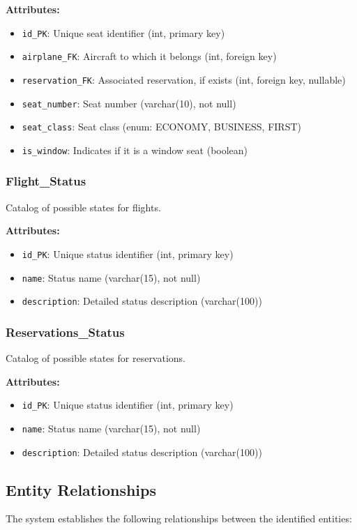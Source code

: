\documentclass[conference]{IEEEtran}
\begin{document}
    \textbf{Attributes:}
    \begin{itemize}
        \item \texttt{id\_PK}: Unique seat identifier (int, primary key)
        \item \texttt{airplane\_FK}: Aircraft to which it belongs (int, foreign key)
        \item \texttt{reservation\_FK}: Associated reservation, if exists (int, foreign key, nullable)
        \item \texttt{seat\_number}: Seat number (varchar(10), not null)
        \item \texttt{seat\_class}: Seat class (enum: ECONOMY, BUSINESS, FIRST)
        \item \texttt{is\_window}: Indicates if it is a window seat (boolean)
    \end{itemize}

    \subsubsection{Flight\_Status}
    Catalog of possible states for flights.

    \textbf{Attributes:}
    \begin{itemize}
        \item \texttt{id\_PK}: Unique status identifier (int, primary key)
        \item \texttt{name}: Status name (varchar(15), not null)
        \item \texttt{description}: Detailed status description (varchar(100))
    \end{itemize}

    \subsubsection{Reservations\_Status}
    Catalog of possible states for reservations.

    \textbf{Attributes:}
    \begin{itemize}
        \item \texttt{id\_PK}: Unique status identifier (int, primary key)
        \item \texttt{name}: Status name (varchar(15), not null)
        \item \texttt{description}: Detailed status description (varchar(100))
    \end{itemize}

    \subsection{Entity Relationships}
    The system establishes the following relationships between the identified entities:
\end{document}
